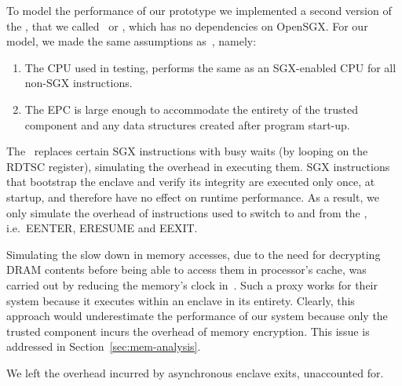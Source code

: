 \documentclass[../../../main.tex]{subfiles}
\begin{document}
\label{sec:perfmodel}
To model the performance of our prototype we implemented a second version of
the \enclaveprogram, that we called \busywait~or \enclavemodel, which
has no dependencies on OpenSGX. For our model, we made the same assumptions
as~\cite{Baumann14}, namely:
\begin{enumerate}
  \item The CPU used in testing, performs the same as an SGX-enabled CPU for
    all non-SGX instructions.
  \item The EPC is large enough to accommodate the entirety of the trusted
    component and any data structures created after program start-up.
\end{enumerate}

The \busywait~replaces certain SGX instructions with busy waits (by looping on
the RDTSC register), simulating the overhead in executing them. SGX
instructions that bootstrap the enclave and verify its integrity are executed
only once, at startup, and therefore have no effect on runtime performance. As
a result, we only simulate the overhead of instructions used to switch to and
from the \enclaveprogram, i.e.\ EENTER, ERESUME and EEXIT.

Simulating the slow down in memory accesses, due to the need for decrypting
DRAM contents before being able to access them in processor's cache, was
carried out by reducing the memory's clock in~\cite{Baumann14}. Such a proxy
works for their system because it executes within an enclave in its entirety.
Clearly, this approach would underestimate the performance of our system
because only the trusted component incurs the overhead of memory encryption.
This issue is addressed in Section~\ref{sec:mem-analysis}.

We left the overhead incurred by asynchronous enclave exits, unaccounted for.
\end{document}
